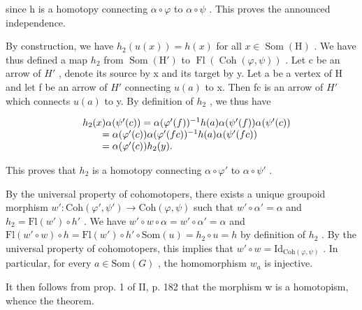 since h is a homotopy connecting \(\alpha \circ \varphi\) to \(\alpha \circ \psi\) . This proves the announced independence.

By construction, we have \(h_{2}(u(x)) = h(x)\) for all \(x \in \operatorname{Som}(\mathrm{H})\) . We have thus defined a map \(h_{2}\) from \(\operatorname{Som}(\mathrm{H}')\) to \(\operatorname{Fl}(\operatorname{Coh}(\varphi, \psi))\) . Let c be an arrow of \(H'\) , denote its source by x and its target by y. Let a be a vertex of H and let f be an arrow of \(H'\) connecting \(u(a)\) to x. Then fc is an arrow of \(H'\) which connects \(u(a)\) to y. By definition of \(h_{2}\) , we thus have

\[
\begin{array}{r l} & h _ {2} (x) \alpha (\psi^ {\prime} (c)) = \alpha (\varphi^ {\prime} (f)) ^ {- 1} h (a) \alpha (\psi^ {\prime} (f)) \alpha (\psi^ {\prime} (c)) \\ & \qquad = \alpha (\varphi^ {\prime} (c)) \alpha (\varphi^ {\prime} (f c)) ^ {- 1} h (a) \alpha (\psi^ {\prime} (f c)) \\ & \qquad = \alpha (\varphi^ {\prime} (c)) h _ {2} (y). \end{array}
\]

This proves that \(h_{2}\) is a homotopy connecting \(\alpha \circ \varphi'\) to \(\alpha \circ \psi'\) .

By the universal property of cohomotopers, there exists a unique groupoid morphism \(w'\colon \mathrm{Coh}(\varphi', \psi') \to \mathrm{Coh}(\varphi, \psi)\) such that \(w' \circ \alpha' = \alpha\) and \(h_2 = \mathrm{Fl}(w') \circ h'\) . We have \(w' \circ w \circ \alpha = w' \circ \alpha' = \alpha\) and \(\mathrm{Fl}(w' \circ w) \circ h = \mathrm{Fl}(w') \circ h' \circ \mathrm{Som}(u) = h_2 \circ u = h\) by definition of \(h_2\) . By the universal property of cohomotopers, this implies that \(w' \circ w = \mathrm{Id}_{\mathrm{Coh}(\varphi, \psi)}\) . In particular, for every \(a \in \mathrm{Som}(G)\) , the homomorphism \(w_a\) is injective.

It then follows from prop. 1 of II, p. 182 that the morphism w is a homotopism, whence the theorem.
\relax{}
